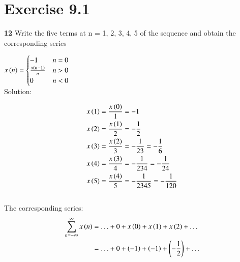 \documentclass[journal,12pt,twocolumn]{IEEEtran}
\begin{document}


\vspace{3cm}

\title{}
\author{EE23BTECH11217 - Prajwal M$^{*}$
}
\maketitle
\newpage
\bigskip



\section*{Exercise 9.1}

\noindent \textbf{12} \hspace{2pt}Write the five terms at n = 1, 2, 3, 4, 5 of the sequence and obtain the corresponding series

$ x \left(n\right) =
\begin{cases}
-1 & n = 0 \\
\frac{x \left(n-1\right)}{n} & n > 0\\
	0 & n < 0
\end{cases}
$
\\

\noindent Solution:

\noindent
\begin{align}
	x \left(1\right) & = \frac{x \left(0\right)}{1} = -1 \\
x \left(2\right) & = \frac{x \left(1\right)}{2} = -\frac{1}{2} \\
x \left(3\right) & = \frac{x \left(2\right)}{3} = -\frac{1}{2   3} = -\frac{1}{6}\\
x \left(4\right) & = \frac{x \left(3\right)}{4} = -\frac{1}{2   3   4} = -\frac{1}{24}\\
x \left(5\right) & = \frac{x \left(4\right)}{5} = -\frac{1}{2   3   4   5} = -\frac{1}{120}
\end{align} \\


The corresponding series:
\begin{align}
	\sum_{n=-\infty}^{\infty} x \left(n\right) & = \ldots + 0 + x\left(0\right) + x \left(1\right) + x \left(2\right) + \ldots \\
	& = \ldots + 0 + \left(-1\right) +  \left(-1\right) +   \left(-\frac{1}{2} \right) + \ldots 
\end{align}
\end{document}
